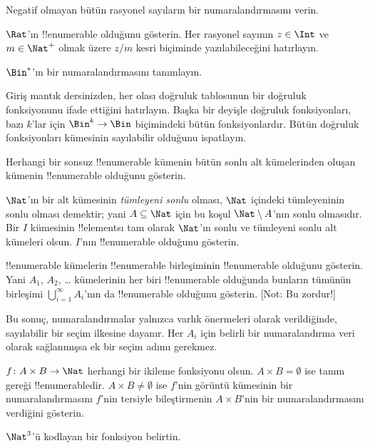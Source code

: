 \documentclass[../../../include/open-logic-section]{subfiles}
\begin{document}
\begin{prob}
Negatif olmayan bütün rasyonel sayıların bir numaralandırmasını verin.
\end{prob}

\begin{prob}
$\Rat$'ın !!{enumerable} olduğunu gösterin. Her rasyonel sayının $z\in\Int$
ve $m\in\Nat^+$ olmak üzere $z/m$ kesri biçiminde yazılabileceğini hatırlayın.
\end{prob}

\begin{prob}
$\Bin^*$'ın bir numaralandırmasını tanımlayın.
\end{prob}

\begin{prob}
Giriş mantık dersinizden, her olası doğruluk tablosunun bir doğruluk
fonksiyonunu ifade ettiğini hatırlayın. Başka bir deyişle doğruluk
fonksiyonları, bazı $k$'lar için $\Bin^k \to \Bin$ biçimindeki bütün
fonksiyonlardır. Bütün doğruluk fonksiyonları kümesinin sayılabilir olduğunu
ispatlayın.
\end{prob}

\begin{prob}
Herhangi bir sonsuz !!{enumerable} kümenin bütün sonlu alt kümelerinden
oluşan kümenin !!{enumerable} olduğunu gösterin.
\end{prob}

\begin{prob}
$\Nat$'ın bir alt kümesinin \emph{tümleyeni sonlu} olması, $\Nat$ içindeki
tümleyeninin sonlu olması demektir; yani $A\subseteq\Nat$ için bu koşul
$\Nat\setminus A$'nın sonlu olmasıdır. Bir $I$ kümesinin !!{element}s{}ı tam
olarak $\Nat$'ın sonlu ve tümleyeni sonlu alt kümeleri olsun. $I$'nın !!{enumerable}
olduğunu gösterin.
\end{prob}

\begin{prob}
!!{enumerable} kümelerin !!{enumerable} birleşiminin !!{enumerable} olduğunu
gösterin. Yani $A_1$, $A_2$, \dots{} kümelerinin her biri !!{enumerable}
olduğunda bunların tümünün birleşimi $\bigcup_{i=1}^\infty A_i$'nın da
!!{enumerable} olduğunu gösterin. [Not: Bu zordur!]
\end{prob}

\begin{editorial}
Bu sonuç, numaralandırmalar yalnızca varlık önermeleri olarak verildiğinde,
sayılabilir bir seçim ilkesine dayanır. Her $A_i$ için belirli bir
numaralandırma veri olarak sağlanmışsa ek bir seçim adımı gerekmez.
\end{editorial}

\begin{prob}
$f\colon A\times B\to\Nat$ herhangi bir ikileme fonksiyonu olsun.
$A\times B=\emptyset$ ise tanım gereği !!{enumerable}{}dir. $A\times B\neq
\emptyset$ ise $f$'nin görüntü kümesinin bir numaralandırmasını $f$'nin
tersiyle bileştirmenin $A\times B$'nin bir numaralandırmasını verdiğini gösterin.
\end{prob}

\begin{prob}
$\Nat^3$'ü kodlayan bir fonksiyon belirtin.
\end{prob}
\end{document}
